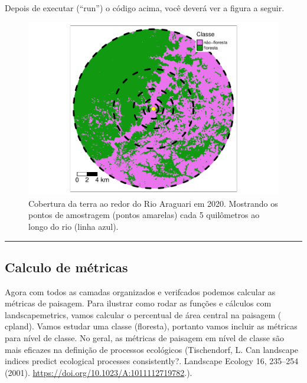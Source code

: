 \documentclass[
]{article}
\begin{document}
Depois de executar (``run'') o código acima, você deverá ver a figura a seguir.

\begin{figure}
\centering
\includegraphics{epr_files/figure-latex/unnamed-chunk-30-1.pdf}
\caption{\label{fig:unnamed-chunk-30}Cobertura da terra ao redor do Rio Araguari em 2020. Mostrando os pontos de amostragem (pontos amarelas) cada 5 quilômetros ao longo do rio (linha azul).}
\end{figure}

\begin{center}\rule{0.5\linewidth}{0.5pt}\end{center}

\newpage

\hypertarget{calculo-de-muxe9tricas}{%
\subsection{Calculo de métricas}\label{calculo-de-muxe9tricas}}

Agora com todos as camadas organizados e verifcados podemos calcular as métricas de paisagem. Para ilustrar como rodar as funções e cálculos com landscapemetrics, vamos calcular o percentual de área central na paisagem ( \colorbox[HTML]{dedede}{cpland}). Vamos estudar uma classe (floresta), portanto vamos incluir as métricas para nível de classe. No geral, as métricas de paisagem em nível de classe são mais eficazes na definição de processos ecológicos (Tischendorf, L. Can landscape indices predict ecological processes consistently?. Landscape Ecology 16, 235--254 (2001).
\url{https://doi.org/10.1023/A:1011112719782}.).
\end{document}
